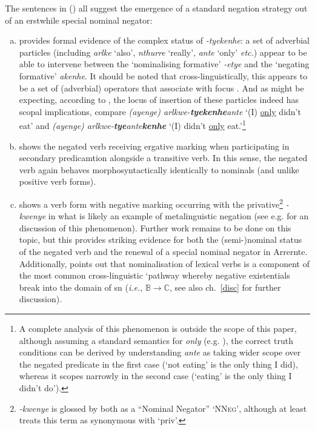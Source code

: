 The sentences in (\lastx) all suggest the emergence of a standard negation strategy out of an erstwhile special nominal negator:
\begin{enumerate}[(a)]

\item provides formal evidence of the complex status of \textit{-tyekenhe}: a set of adverbial particles (including \textit{\textdblhyphen arlke} `also', \textit{\textdblhyphen nthurre} `really', \textit{\textdblhyphen ante} `only' \textit{etc.}) appear to be able to intervene between the `nominalising formative' \textit{-etye} and the `negating formative' \textit{\textdblhyphen akenhe}. It should be noted that cross-linguistically, this appears to be a set of (adverbial) operators that associate with focus \citep[e.g][]{Jackendoff1972,Rooth1985}. And as might be expecting, according to \citet[381]{Wilkins1989}, the locus of insertion of these particles indeed has scopal implications, compare \textit{(ayenge) arlkwe-\textbf{tyekenhe}\textdblhyphen ante} `(I) \ul{only} didn't eat' and \textit{(ayenge) arlkwe-\textbf{tye}\guillemotleft ante\guillemotright\textbf{kenhe}} `(I) didn't \ul{only} eat.'\footnote{A complete analysis of this phenomenon is outside the scope of this paper, although assuming a standard semantics for \textit{only} (e.g. \citealt{Horn1969}), the correct truth conditions can be derived by understanding \textit{\textdblhyphen ante} as taking wider scope over the negated predicate in the first case (`not eating' is the only thing I did), whereas it scopes narrowly in the second case (`eating' is the only thing I didn't do').}
 
\item shows the negated verb receiving ergative marking when participating in secondary predicamtion alongside a transitive verb. In this sense, the negated verb again behaves morphosyntactically identically to nominals (and unlike positive verb forms).

\item shows a verb form with negative marking occurring with the privative\footnote{\textit{-kwenye} is glossed by both \citet{Henderson2013,Wilkins1989} as a ``Nominal Negator'' `\textsc{NNeg}', although at least \citet[158]{Wilkins1989} treats this term as synonymous with `\gls{priv}'.} \textit{-kwenye} in what is likely an example of metalinguistic negation (see e.g. \citealt[19]{Horn2017} for an discussion of this phenomenon). Further work remains to be done on this topic, but this provides striking evidence for both the (semi-)nominal status of the negated verb and the renewal of a special nominal negator in Arrernte. Additionally, \citet[171]{Veselinova2016} points out that nominalisation of lexical verbs is a component of the most common cross-linguistic `pathway whereby negative existentials break into the domain of \acrshort{sn} (\textit{i.e.}, $\mathbb{B\to C}$, see also ch.~\ref{disc} for further discussion).\end{enumerate}


